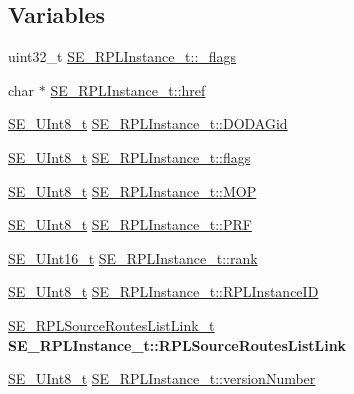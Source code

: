 \subsection*{Variables}
\begin{DoxyCompactItemize}
\item 
uint32\+\_\+t \hyperlink{group__RPLInstance_ga915b676adc88c489d4e4c8f66d306819}{S\+E\+\_\+\+R\+P\+L\+Instance\+\_\+t\+::\+\_\+flags}
\item 
char $\ast$ \hyperlink{group__RPLInstance_gad7342c6b8b1b213decb3e5b625c1fba6}{S\+E\+\_\+\+R\+P\+L\+Instance\+\_\+t\+::href}
\item 
\hyperlink{group__UInt8_gaf7c365a1acfe204e3a67c16ed44572f5}{S\+E\+\_\+\+U\+Int8\+\_\+t} \hyperlink{group__RPLInstance_gada9d3472a6be71b1180ba77a6e919bdf}{S\+E\+\_\+\+R\+P\+L\+Instance\+\_\+t\+::\+D\+O\+D\+A\+Gid}
\item 
\hyperlink{group__UInt8_gaf7c365a1acfe204e3a67c16ed44572f5}{S\+E\+\_\+\+U\+Int8\+\_\+t} \hyperlink{group__RPLInstance_ga0148c5566a77d44da206ea45559c1f63}{S\+E\+\_\+\+R\+P\+L\+Instance\+\_\+t\+::flags}
\item 
\hyperlink{group__UInt8_gaf7c365a1acfe204e3a67c16ed44572f5}{S\+E\+\_\+\+U\+Int8\+\_\+t} \hyperlink{group__RPLInstance_ga7aa19d5e2130614971d02df0f802544b}{S\+E\+\_\+\+R\+P\+L\+Instance\+\_\+t\+::\+M\+OP}
\item 
\hyperlink{group__UInt8_gaf7c365a1acfe204e3a67c16ed44572f5}{S\+E\+\_\+\+U\+Int8\+\_\+t} \hyperlink{group__RPLInstance_ga6dee29098403067a7d66d7e44e3f0987}{S\+E\+\_\+\+R\+P\+L\+Instance\+\_\+t\+::\+P\+RF}
\item 
\hyperlink{group__UInt16_gac68d541f189538bfd30cfaa712d20d29}{S\+E\+\_\+\+U\+Int16\+\_\+t} \hyperlink{group__RPLInstance_ga7647975b9cf14e69fd31839aec60594b}{S\+E\+\_\+\+R\+P\+L\+Instance\+\_\+t\+::rank}
\item 
\hyperlink{group__UInt8_gaf7c365a1acfe204e3a67c16ed44572f5}{S\+E\+\_\+\+U\+Int8\+\_\+t} \hyperlink{group__RPLInstance_ga9582d2254e7cee7d1b4c6665b6530088}{S\+E\+\_\+\+R\+P\+L\+Instance\+\_\+t\+::\+R\+P\+L\+Instance\+ID}
\item 
\mbox{\label{group__RPLInstance_ga63f3dad3991eb31577fc488907e29f4a}} 
\hyperlink{structSE__RPLSourceRoutesListLink__t}{S\+E\+\_\+\+R\+P\+L\+Source\+Routes\+List\+Link\+\_\+t} {\bfseries S\+E\+\_\+\+R\+P\+L\+Instance\+\_\+t\+::\+R\+P\+L\+Source\+Routes\+List\+Link}
\item 
\hyperlink{group__UInt8_gaf7c365a1acfe204e3a67c16ed44572f5}{S\+E\+\_\+\+U\+Int8\+\_\+t} \hyperlink{group__RPLInstance_gaf6df9d11f50aa3ba36f4c9cd14b71314}{S\+E\+\_\+\+R\+P\+L\+Instance\+\_\+t\+::version\+Number}
\end{DoxyCompactItemize}


